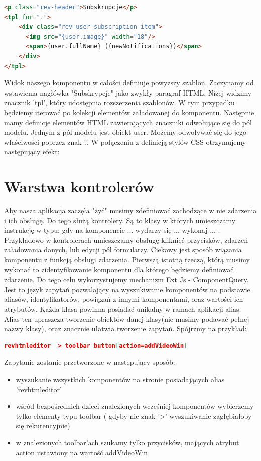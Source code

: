 \begin{lstlisting}[language=HTML]
<p class="rev-header">Subskrupcje</p>
<tpl for=".">
    <div class="rev-user-subscription-item">
      <img src="{user.image}" width="18"/>
      <span>{user.fullName} ({newNotifications})</span>
    </div>
</tpl>
\end{lstlisting}

Widok naszego komponentu w całości definiuje powyższy szablon. Zaczynamy od wstawienia nagłówka "Subskrypcje" jako zwykły paragraf HTML. Niżej widzimy znacznik 'tpl', który udostępnia rozszerzenia szablonów. W tym przypadku będziemy iterować po kolekcji elementów załadowanej do komponentu. Następnie mamy definicje elementów HTML zawierających znaczniki odwołujące się do pól modelu. Jednym z pól modelu jest obiekt user. Możemy odwoływać się do jego właściwości poprzez znak '.'. W połączeniu z definicją stylów CSS otrzymujemy następujący efekt:

 


\section{Warstwa kontrolerów}

Aby nasza aplikacja zaczęła "żyć" musimy zdefiniować zachodzące w nie zdarzenia i ich obsługę. Do tego służą kontrolery. Są to klasy w których umieszczamy instrukcję w typu: gdy na komponencie ... wydarzy się ... wykonaj ... . Przykładowo w kontrolerach umieszczamy obsługę kliknięć przycisków, zdarzeń załadowania danych, lub edycji pól formularzy. Ciekawy jest sposób wiązania komponentu z funkcją obsługi zdarzenia. Pierwszą istotną rzeczą, którą musimy wykonać to zidentyfikowanie komponentu dla którego będziemy definiować zdarzenie. Do tego celu wykorzystujemy mechanizm Ext Js - ComponentQuery. Jest to język zapytań pozwalający na wyszukiwanie komponentów na podstawie aliasów, identyfikatorów, powiązań z innymi komponentami, oraz wartości ich atrybutów. Każda klasa powinna posiadać unikalny w ramach aplikacji alias. Alias ten upraszcza tworzenie obiektów danej klasy(nie musimy podawać pełnej nazwy klasy), oraz znacznie ułatwia tworzenie zapytań. Spójrzmy na przykład: 

\begin{lstlisting}[language=json]
revhtmleditor  > toolbar button[action=addVideoWin]
\end{lstlisting}

Zapytanie zostanie przetworzone w następujący sposób:

\begin{itemize}
\item wyszukanie wszystkich komponentów na stronie posiadających alias 'revhtmleditor'
\item wśród bezpośrednich dzieci znalezionych wcześniej komponentów wybierzemy tylko elementy typu toolbar ( gdyby nie znak '>' wyszukiwanie zagłębiałoby się rekurencyjnie)
\item w znalezionych toolbar'ach szukamy tylko przycisków, mających atrybut action ustawiony na wartość addVideoWin
\end{itemize}

